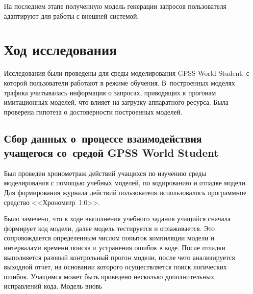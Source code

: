 \begin{multicols}{2}
  На последнем этапе полученную модель генерации запросов пользователя 
адаптируют для работы с внешней системой. 

\section{Ход исследования}
  
  Исследования были проведены для среды моделирования GPSS World 
Student, с которой пользователи работают в режиме обучения. В~построенных 
моделях трафика учитывалась информация о запросах, приводящих к прогонам 
имитационных моделей, что влияет на загрузку аппаратного ресурса. Была 
проверена гипотеза о достоверности построенных моделей. 

\subsection{Сбор данных о~процессе взаимодействия учащегося со~средой 
GPSS World Student}
  
  Был проведен хронометраж действий учащихся по изучению среды 
моделирования с помощью учебных моделей, по кодированию и отладке модели. 
Для формирования журнала действий пользователя использовалось программное 
средство <<Хронометр~1.0>>. 


  Было замечено, что в ходе выполнения учебного задания учащийся сначала 
формирует код модели, далее модель тестируется и отлаживается. Это 
сопровождается определенным числом попыток компиляции модели и 
интервалами времени поиска и устранения ошибок в коде. После отладки 
выполняется разовый контрольный прогон модели, после чего анализируется 
выходной отчет, на основании которого осуществляется поиск логических 
ошибок. Учащимся может быть проведено несколько дополнительных 
исправлений кода. Модель вновь\linebreak\vspace*{-12pt}
\pagebreak

\end{multicols}

\begin{figure} %
 \vspace*{1pt}
 \begin{center}
 \mbox{%
 \epsfxsize=158.423mm
 }
 \end{center}
 \vspace*{-9pt}
\vspace*{6pt}
\end{figure}

